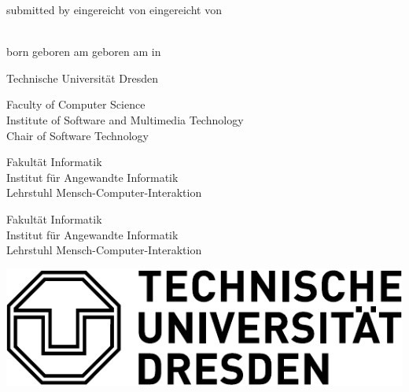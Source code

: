 
\begin{titlepage}

\begin{center}

	{\large
		\doctype\relax
	}
	
	\vspace{.5cm}
	
	{\huge \bfseries \sffamily
		\doctitle\relax
		\par
	}
	
	\vspace{1.5cm}
	
	\ifx\doclanguage\english
		submitted by
	\fi
	\ifx\doclanguage\german
		eingereicht von
	\fi
	\ifx\doclanguage\ngerman
		eingereicht von
	\fi
	
	\vspace{.5cm}
	
	\textbf{\authorname} \\
	\ifx\doclanguage\english
		born
	\fi
	\ifx\doclanguage\german
		geboren am
	\fi
	\ifx\doclanguage\ngerman
		geboren am
	\fi
	\authorbirthday{} in \authorbirthplace

	
	\vspace{1.5cm}
	
	{\Large Technische Universität Dresden}
	
	\vspace{.5cm}
	
	\ifx\doclanguage\english
		Faculty of Computer Science \\
		Institute of Software and Multimedia Technology \\
		Chair of Software Technology

	\fi
	\ifx\doclanguage\german
		Fakultät Informatik \\
		Institut für Angewandte Informatik \\
		Lehrstuhl Mensch-Computer-Interaktion

	\fi
	\ifx\doclanguage\ngerman
		Fakultät Informatik \\
		Institut für Angewandte Informatik \\
		Lehrstuhl Mensch-Computer-Interaktion

	\fi
	
	\vspace{1.0cm}
	
	\includegraphics[scale=.75]{includes/figures/tu_logo}
	

\end{center}
\end{titlepage}

